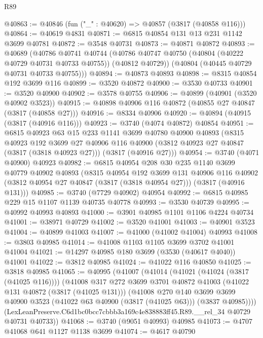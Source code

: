 \begin{lexlean}{R89}
\begin{coremodule}
@40863 := @40846 (fun ("_" : @40620) => @40857 (@3817 (@40858 @116)))
@40864 := @40619 @4831
@40871 := @6815 @40854 @131 @13 @231 @1142 @3699 @40781
@40872 := @3548 @40731
@40873 := @40871 @40872
@40893 := @40689
    (@40786
      @40741
      @40744
      (@40786 @40747 @40750 (@40804 (@40222 @40729 @40731 @40733 @40755)) (@40812 @40729))
      (@40804 (@40445 @40729 @40731 @40733 @40755)))
@40894 := @40873 @40893
@40898 := @8315 @40854 @192 @3699 @116
@40899 := @3520 @40872
@40900 := @3530 @40733
@40901 := @3520 @40900
@40902 := @3578 @40755
@40906 := @40899 (@40901 (@3520 @40902 @3523))
@40915 := @40898 @40906 @116 @40872 (@40855 @27 @40847 (@3817 (@40858 @27)))
@40916 := @8334 @40906
@40920 := @40894 (@40915 (@3817 (@40916 @116)))
@40923 := @3740 (@4074 @40872) @40854
@40951 := @6815
    @40923
    @63
    @15
    @233
    @1141
    @3699
    @40780
    @40900
    @40893
    (@8315
      @40923
      @192
      @3699
      @27
      @40906
      @116
      @40900
      (@3812 @40923 @27 @40847 (@3817 (@3818 @40923 @27)))
      (@3817 (@40916 @27)))
@40954 := @3740 (@4071 @40900) @40923
@40982 := @6815
    @40954
    @208
    @30
    @235
    @1140
    @3699
    @40779
    @40902
    @40893
    (@8315
      @40954
      @192
      @3699
      @131
      @40906
      @116
      @40902
      (@3812 @40954 @27 @40847 (@3817 (@3818 @40954 @27)))
      (@3817 (@40916 @131)))
@40985 := @3740 (@7729 @40902) @40954
@40992 := @6815 @40985 @229 @15 @1107 @1139 @40735 @40778
@40993 := @3530 @40739
@40995 := @40992 @40993 @40893
@41000 := @3901 @40985 @1101 @1106 @4224 @40734
@41001 := @38971 @40729
@41002 := @3520 @41001
@41003 := @40901 @3523
@41004 := @40899 @41003
@41007 := @41000 (@41002 @41004) @40993
@41008 := @3803 @40985
@41014 := @41008 @1103 @1105 @3699 @3702 @41001 @41004
@41021 := @14297 @40985 @180 @3699 (@3530 (@40617 @4040)) @41001
@41022 := @3812 @40985
@41024 := @41022 @116 @40850
@41025 := @3818 @40985
@41065 := @40995
    (@41007
      (@41014
        (@41021 (@41024 (@3817 (@41025 @116))))
        (@41008
          @317
          @272
          @3699
          @3701
          @40872
          @41003
          (@41022 @131 @40872 (@3817 (@41025 @131)))
          (@41008
            @270
            @140
            @3699
            @3699
            @40900
            @3523
            (@41022 @63 @40900 (@3817 (@41025 @63)))
            (@3837 @40985))))
      (LexLeanPreserve.C6d1bc0bcc7cbbb3a169c4e838883ff45.R89.__rel_34 @40729 @40731 @40733))
@41068 := @3740 (@9051 @40993) @40985
@41073 := @4707 @41068 @641 @1127 @1138 @3699
@41074 := @4617 @40790

\end{coremodule}
\end{lexlean}
